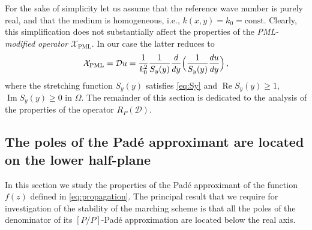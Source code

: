 \documentclass[11pt,a4paper]{article}
\newcommand{\cD}{\mathcal{D}}
\newcommand{\cX}{\mathcal{X}}
\DeclareMathOperator{\Real}{Re}
\DeclareMathOperator{\Imag}{Im}
\theoremstyle{plain}%
\theoremstyle{definition}
\theoremstyle{remark}
\begin{document}
For the sake of simplicity let us assume that the reference wave number is purely real, and that the medium is homogeneous, i.e., $k(x,y) = k_0= \text{const}$. 
Clearly, this simplification does not substantially affect the properties of the \textit{PML-modified operator} $\cX_{\mathrm{PML}}$. 
In our case the latter reduces to  
\begin{equation*}
     \cX_{\mathrm{PML}} = \cD u = \frac{1}{k_0^2}\frac{1}{S_y(y)} \frac{d}{dy}\Bigl( \frac{1}{S_y(y)} \frac{d u}{dy} \Bigr)\,,
\end{equation*}
where the stretching function $S_y(y)$ satisfies
\eqref{eq:Sy} and $\Real S_y(y) \ge1$, $\Imag S_y(y) \ge0$ in $\Omega$.
The remainder of this section is dedicated to the analysis of the properties of the operator $R_P(\cD)$.


\subsection{The poles of the Pad\'e approximant are located on the lower half-plane}\label{subsec:poles}
In this section we study the properties of the Pad\'e approximant of the function $f(z)$ defined in \eqref{eq:propagation}. 
The principal result that we require for investigation of the stability of the marching scheme is that all the poles of the denominator of its $[P/P]$-Pad\'e approximation are located below the real axis. 
\end{document}
